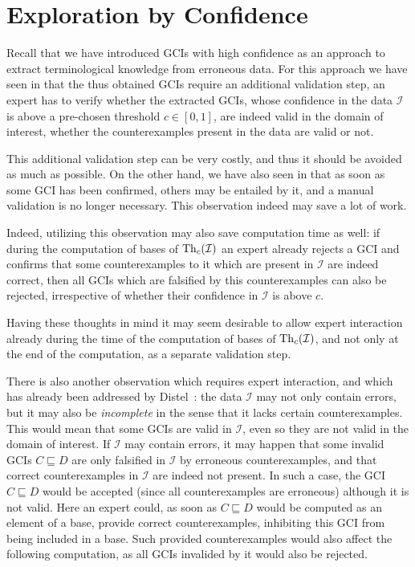 \chapter{Exploration by Confidence}
\label{cha:expl-conf}

Recall that we have introduced GCIs with high confidence as an approach to extract
terminological knowledge from erroneous data.  For this approach we have seen in
 that the thus obtained GCIs require an additional validation
step, \ie an expert has to verify whether the extracted GCIs, whose confidence in the data
$\mathcal{I}$ is above a pre-chosen threshold $c \in [0,1]$, are indeed valid in the
domain of interest, \ie whether the counterexamples present in the data are valid or not.

This additional validation step can be very costly, and thus it should be avoided as much
as possible.  On the other hand, we have also seen in  that as
soon as some GCI has been confirmed, others may be entailed by it, and a manual validation
is no longer necessary.  This observation indeed may save a lot of work.

Indeed, utilizing this observation may also save computation time as well: if during the
computation of bases of $\operatorname{Th}_c(\mathcal{I})$ an expert already rejects a GCI and confirms
that some counterexamples to it which are present in $\mathcal{I}$ are indeed correct,
then all GCIs which are falsified by this counterexamples can also be rejected,
irrespective of whether their confidence in $\mathcal{I}$ is above $c$.

Having these thoughts in mind it may seem desirable to allow expert interaction already
during the time of the computation of bases of $\operatorname{Th}_c(\mathcal{I})$, and not only at the
end of the computation, as a separate validation step.

There is also another observation which requires expert interaction, and which has already
been addressed by Distel~\cite{Diss-Felix}: the data $\mathcal{I}$ may not only contain
errors, but it may also be \emph{incomplete} in the sense that it lacks certain
counterexamples.  This would mean that some GCIs are valid in $\mathcal{I}$, even so they
are not valid in the domain of interest.  If $\mathcal{I}$ may contain errors, it may
happen that some invalid GCIs $C \sqsubseteq D$ are only falsified in $\mathcal{I}$ by
erroneous counterexamples, and that correct counterexamples in $\mathcal{I}$ are indeed
not present.  In such a case, the GCI $C \sqsubseteq D$ would be accepted (since all
counterexamples are erroneous) although it is not valid.  Here an expert could, as soon as
$C \sqsubseteq D$ would be computed as an element of a base, provide correct
counterexamples, inhibiting this GCI from being included in a base.  Such provided
counterexamples would also affect the following computation, as all GCIs invalided by it
would also be rejected.

